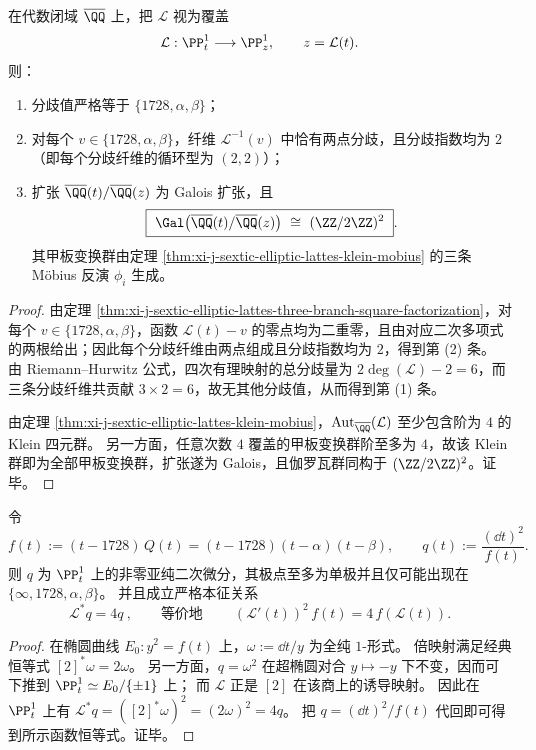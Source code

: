 \begin{corollary}\label{cor:xi-j-sextic-elliptic-lattes-v4-galois-branching}
在代数闭域 \(\overline{\QQ}\) 上，把 \(\mathcal L\) 视为覆盖
\[
\mathcal L:\PP^1_t\longrightarrow \PP^1_{z},\qquad z=\mathcal L(t).
\]
则：
\begin{enumerate}
\normalfont
  \item 分歧值严格等于 \(\{1728,\alpha,\beta\}\)；
  \item 对每个 \(v\in\{1728,\alpha,\beta\}\)，纤维 \(\mathcal L^{-1}(v)\) 中恰有两点分歧，且分歧指数均为 \(2\)（即每个分歧纤维的循环型为 \((2,2)\)）；
  \item 扩张 \(\overline{\QQ}(t)/\overline{\QQ}(z)\) 为 Galois 扩张，且
  \[
  \boxed{\ \Gal\bigl(\overline{\QQ}(t)/\overline{\QQ}(z)\bigr)\ \cong\ (\ZZ/2\ZZ)^2\ }.
  \]
  其甲板变换群由定理 \ref{thm:xi-j-sextic-elliptic-lattes-klein-mobius} 的三条 Möbius 反演 \(\phi_i\) 生成。
\end{enumerate}
\end{corollary}
\begin{proof}
由定理 \ref{thm:xi-j-sextic-elliptic-lattes-three-branch-square-factorization}，对每个 \(v\in\{1728,\alpha,\beta\}\)，函数 \(\mathcal L(t)-v\) 的零点均为二重零，且由对应二次多项式的两根给出；因此每个分歧纤维由两点组成且分歧指数均为 \(2\)，得到第 (2) 条。
由 Riemann--Hurwitz 公式，四次有理映射的总分歧量为 \(2\deg(\mathcal L)-2=6\)，而三条分歧纤维共贡献 \(3\times 2=6\)，故无其他分歧值，从而得到第 (1) 条。
\par
由定理 \ref{thm:xi-j-sextic-elliptic-lattes-klein-mobius}，\(\mathrm{Aut}_{\overline{\QQ}}(\mathcal L)\) 至少包含阶为 \(4\) 的 Klein 四元群。
另一方面，任意次数 \(4\) 覆盖的甲板变换群阶至多为 \(4\)，故该 Klein 群即为全部甲板变换群，扩张遂为 Galois，且伽罗瓦群同构于 \((\ZZ/2\ZZ)^2\)。证毕。
\end{proof}

\begin{theorem}[特征二次微分的本征拉回：\texorpdfstring{$\mathcal L^\ast q=4q$}{L^*q=4q}]\label{thm:xi-j-sextic-elliptic-lattes-quadratic-differential-eigen}
令
\[
f(t):=(t-1728)\,Q(t)=(t-1728)(t-\alpha)(t-\beta),
\qquad
q(t):=\frac{(\dd t)^2}{f(t)}.
\]
则 \(q\) 为 \(\PP^1_t\) 上的非零亚纯二次微分，其极点至多为单极并且仅可能出现在 \(\{\infty,1728,\alpha,\beta\}\)。
并且成立严格本征关系
\[
\boxed{\ \mathcal L^{\ast}q=4q\ },
\qquad\text{等价地}\qquad
\boxed{\ (\mathcal L'(t))^{2}\,f(t)=4\,f(\mathcal L(t)).\ }
\]
\end{theorem}
\begin{proof}
在椭圆曲线 \(E_0:y^2=f(t)\) 上，\(\omega:=\dd t/y\) 为全纯 \(1\)-形式。
倍映射满足经典恒等式 \([2]^{\ast}\omega=2\omega\)。
另一方面，\(q=\omega^2\) 在超椭圆对合 \(y\mapsto -y\) 下不变，因而可下推到 \(\PP^1_t\simeq E_0/\{\pm 1\}\) 上；
而 \(\mathcal L\) 正是 \([2]\) 在该商上的诱导映射。
因此在 \(\PP^1_t\) 上有
\(
\mathcal L^{\ast}q=([2]^{\ast}\omega)^2=(2\omega)^2=4q
\)。
把 \(q=(\dd t)^2/f(t)\) 代回即可得到所示函数恒等式。证毕。
\end{proof}

